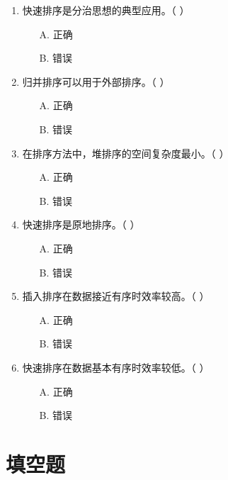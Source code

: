 \documentclass[12pt, a4paper]{article}
\begin{document}
\begin{enumerate}[label=\arabic*.]
	\item 快速排序是分治思想的典型应用。（ ）
	      \begin{enumerate}
		      \item[A.] 正确
		      \item[B.] 错误
	      \end{enumerate}

	\item 归并排序可以用于外部排序。（ ）
	      \begin{enumerate}
		      \item[A.] 正确
		      \item[B.] 错误
	      \end{enumerate}

	\item 在排序方法中，堆排序的空间复杂度最小。（ ）
	      \begin{enumerate}
		      \item[A.] 正确
		      \item[B.] 错误
	      \end{enumerate}

	\item 快速排序是原地排序。（ ）
	      \begin{enumerate}
		      \item[A.] 正确
		      \item[B.] 错误
	      \end{enumerate}

	\item 插入排序在数据接近有序时效率较高。（ ）
	      \begin{enumerate}
		      \item[A.] 正确
		      \item[B.] 错误
	      \end{enumerate}

	\item 快速排序在数据基本有序时效率较低。（ ）
	      \begin{enumerate}
		      \item[A.] 正确
		      \item[B.] 错误
	      \end{enumerate}
\end{enumerate}

\section*{填空题}
\end{document}
